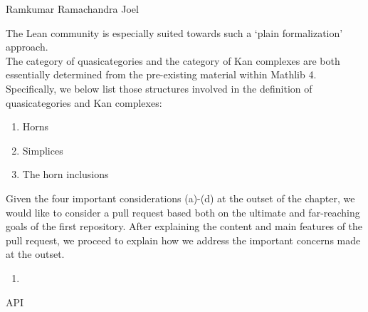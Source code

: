 \documentclass{book}
\begin{document}
Ramkumar Ramachandra
Joel
\fi

\iffalse
Needless to say, there are extensive differences between approaches to the study of ∞-categories and ∞-groupoids based in HoTT (homotopy type theory) and what some have called "plain foramlization". Such a plain formalization could make use of ETCC (elementary theory of the category of categories), which would involve defining the following structures along with corresponding results involving replacement for dependent types:

\begin{enumerate}
\item Category
\item Functor 
\item Natural$\_$Transformation
\item Equation (between natural transformations)
\end{enumerate}
\fi

The Lean community is especially suited towards such a `plain formalization' approach. \\

The category of quasicategories and the category of Kan complexes are both essentially determined from the pre-existing material within Mathlib 4. Specifically, we below list those structures involved in the definition of quasicategories and Kan complexes:

\begin{enumerate}
\item Horns
\item Simplices
\item The horn inclusions
\end{enumerate}

Given the four important considerations (a)-(d) at the outset of the chapter, we would like to consider a pull request based both on the ultimate and far-reaching goals of the first repository. After explaining the content and main features of the pull request, we proceed to explain how we address the important concerns made at the outset.

\begin{enumerate}
\item 
\end{enumerate}

API 




\iffalse
It is also important to explicitly name the category of quasicategories and the category of 
-
-
\fi
\end{document}
